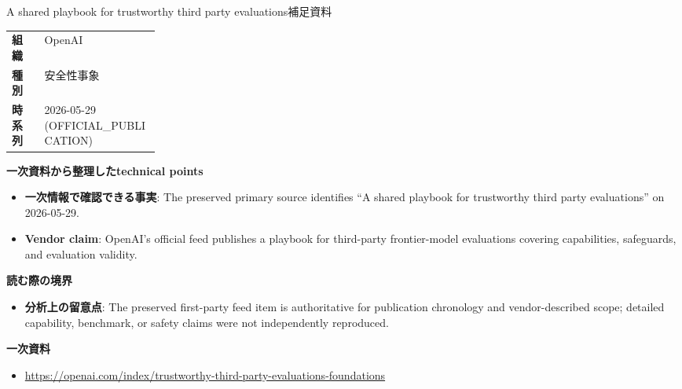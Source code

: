 \begin{technicalnote}{A shared playbook for trustworthy third party evaluations}{補足資料}
\begin{tabularx}{\linewidth}{@{}>{\bfseries}p{0.22\linewidth}X@{}}
組織 & OpenAI \\
種別 & 安全性事象 \\
時系列 & 2026-05-29 (OFFICIAL\_PUBLICATION) \\
\end{tabularx}
\smallskip
{\bfseries 一次資料から整理したtechnical points}
\begin{itemize}[leftmargin=1.5em,itemsep=0.35em]
\item \textbf{一次情報で確認できる事実}: The preserved primary source identifies “A shared playbook for trustworthy third party evaluations” on 2026-05-29.
\item \textbf{Vendor claim}: OpenAI's official feed publishes a playbook for third-party frontier-model evaluations covering capabilities, safeguards, and evaluation validity.
\end{itemize}
{\bfseries 読む際の境界}
\begin{itemize}[leftmargin=1.5em,itemsep=0.35em]
\item \textbf{分析上の留意点}: The preserved first-party feed item is authoritative for publication chronology and vendor-described scope; detailed capability, benchmark, or safety claims were not independently reproduced.
\end{itemize}
{\bfseries 一次資料}
\begingroup\sloppy
\begin{itemize}[leftmargin=1.5em,itemsep=0.25em]
\item {\scriptsize\url{https://openai.com/index/trustworthy-third-party-evaluations-foundations}}
\end{itemize}
\endgroup
\end{technicalnote}
\medskip
